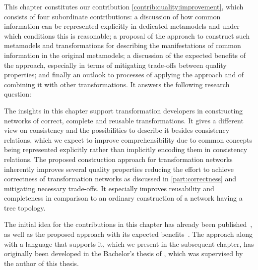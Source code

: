 
This chapter constitutes our contribution \autoref{contrib:quality:improvement}, which consists of four subordinate contributions: a discussion of how common information can be represented explicitly in dedicated metamodels and under which conditions this is reasonable; a proposal of the \commonalities approach to construct such metamodels and transformations for describing the manifestations of common information in the original metamodels; a discussion of the expected benefits of the approach, especially in terms of mitigating trade-offs between quality properties; and finally an outlook to processes of applying the approach and of combining it with other transformations. It answers the following research question:


The insights in this chapter support transformation developers in constructing networks of correct, complete and reusable transformations.
It gives a different view on consistency and the possibilities to describe it besides consistency relations, which we expect to improve comprehensibility due to common concepts being represented explicitly rather than implicitly encoding them in consistency relations.
The proposed construction approach for transformation networks inherently improves several quality properties reducing the effort to achieve correctness of transformation networks as discussed in \autoref{part:correctness} and mitigating necessary trade-offs.
It especially improves reusability and completeness in comparison to an ordinary construction of a network having a tree topology.

The initial idea for the contributions in this chapter has already been published~, as well as the proposed \commonalities approach with its expected benefits~.
The approach along with a language that supports it, which we present in the subsequent chapter, has originally been developed in the Bachelor's thesis of , which was supervised by the author of this thesis.










